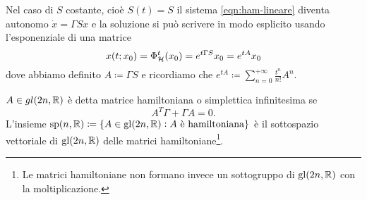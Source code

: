 Nel caso di $ S $ costante, cioè $ S(t) = S $ il sistema \eqref{eqn:ham-lineare} diventa autonomo $ \dot{x} = \Gamma S x $ e la soluzione si può scrivere in modo esplicito usando l'esponenziale di una matrice
\begin{equation}
    x(t; x_0) = \Phi^t_{\mathcal{H}}(x_0) = e^{t \Gamma S} x_0 = e^{tA} x_0
\end{equation}
dove abbiamo definito $ A \coloneqq \Gamma S $ e ricordiamo che $ e^{tA} \coloneqq \sum_{n=0}^{+\infty} \frac{t^n}{n!}A^n $.

\begin{definition}
    $ A \in gl(2n, \mathbb{R}) $ è detta matrice hamiltoniana o simplettica infinitesima se
    \begin{equation}
        A^T \Gamma + \Gamma A = 0.
    \end{equation}
    L'insieme $ \mathrm{sp}(n, \mathbb{R}) \coloneqq \{A \in \mathrm{gl}(2n, \mathbb{R}) : A \text{ è hamiltoniana}\} $ è il sottospazio vettoriale di $ \mathrm{gl}(2n, \mathbb{R}) $ delle matrici hamiltoniane\footnote{Le matrici hamiltoniane non formano invece un sottogruppo di $ \mathrm{gl}(2n, \mathbb{R}) $ con la moltiplicazione.}.
\end{definition}

